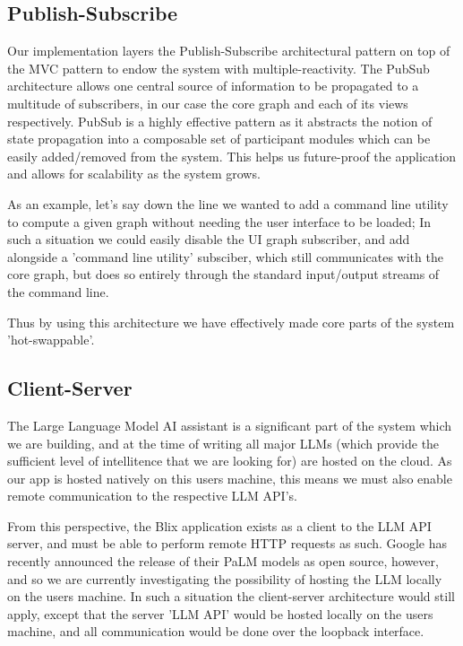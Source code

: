 \documentclass[11pt,a4paper]{article}
\begin{document}
\subsection{Publish-Subscribe}
Our implementation layers the Publish-Subscribe architectural pattern on top of the MVC pattern to endow the system with multiple-reactivity.
The PubSub architecture allows one central source of information to be propagated to a multitude of subscribers, in our case the core graph and each of its views respectively.
PubSub is a highly effective pattern as it abstracts the notion of state propagation into a composable set of participant modules which can be easily added/removed from the system.
This helps us future-proof the application and allows for scalability as the system grows.

As an example, let's say down the line we wanted to add a command line utility to compute a given graph without needing the user interface to be loaded;
In such a situation we could easily disable the UI graph subscriber, and add alongside a 'command line utility' subsciber, which still communicates with the core graph, but does so entirely through the standard input/output streams of the command line.

Thus by using this architecture we have effectively made core parts of the system 'hot-swappable'.

\subsection{Client-Server}
The Large Language Model AI assistant is a significant part of the system which we are building, and at the time of writing all major LLMs (which provide the sufficient level of intellitence that we are looking for) are hosted on the cloud. As our app is hosted natively on this users machine, this means we must also enable remote communication to the respective LLM API's.

From this perspective, the Blix application exists as a client to the LLM API server, and must be able to perform remote HTTP requests as such.
Google has recently announced the release of their PaLM models as open source, however, and so we are currently investigating the possibility of hosting the LLM locally on the users machine.
In such a situation the client-server architecture would still apply, except that the server 'LLM API' would be hosted locally on the users machine, and all communication would be done over the loopback interface.
\end{document}
